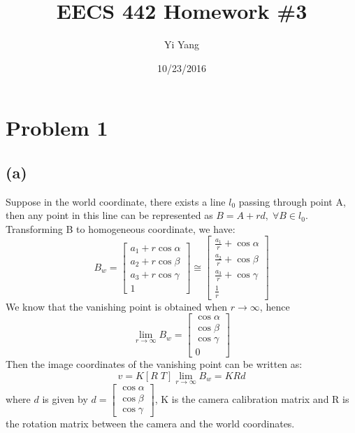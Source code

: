 \documentclass[letterpaper]{article}
\author{Yi Yang}
\title{EECS 442 Homework \#3}
\begin{document}
\date{10/23/2016}
\maketitle

\newcommand{\trace}{\mathrm{trace}}
\newcommand{\real}{\mathbb R}  %
\newcommand{\nat}{\mathbb N}   %
\newcommand{\cp}{\mathbb C}    %
\newcommand{\ds}{\displaystyle}
\newcommand{\mf}[2]{\frac{\ds #1}{\ds #2}}
\newcommand{\spanof}[1]{\textrm{span} \{ #1 \}}
\newcommand{\sol}[0]{\textbf{Solution: }}
\newcommand{\pf}[0]{\textbf{Proof:}}
\newcommand{\rme}[0]{\textrm{e}}
\newcommand{\Null}[1]{\textrm{Null}\{#1\}}
\parindent 0pt
\section*{Problem 1}
\subsection*{(a)}
Suppose in the world coordinate, there exists a line $l_0$ passing through point A, then any point in this line can be represented as $B = A + rd,\; \forall B\in l_0$. Transforming B to homogeneous coordinate, we have:
$$B_w = 
\begin{bmatrix}
a_1 + r\cos{\alpha}\\
a_2 + r\cos{\beta}\\
a_3 + r\cos{\gamma}\\
1
\end{bmatrix}
\cong
\begin{bmatrix}
\mf{a_1}{r} + \cos{\alpha}\\
\mf{a_2}{r} + \cos{\beta}\\
\mf{a_3}{r} + \cos{\gamma}\\
\mf{1}{r}
\end{bmatrix}
$$
We know that the vanishing point is obtained when $r\rightarrow \infty$, hence
$$\lim_{r\rightarrow\infty}B_w = 
\begin{bmatrix}
\cos{\alpha}\\
\cos{\beta}\\
\cos{\gamma}\\
0
\end{bmatrix}
$$
Then the image coordinates of the vanishing point can be written as:
$$v = K[R\; T]\lim_{r\rightarrow\infty}B_w = KRd$$
where $d$ is given by $d = \begin{bmatrix}
\cos{\alpha}\\
\cos{\beta}\\
\cos{\gamma}
\end{bmatrix}
$, K is the camera calibration matrix and R is the rotation matrix between the camera and the world coordinates.
\end{document}
